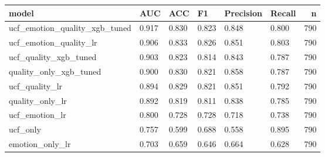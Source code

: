 \begin{tabular}{llllllr}
\toprule
model & AUC & ACC & F1 & Precision & Recall & n \\
\midrule
ucf\_emotion\_quality\_xgb\_tuned & 0.917 & 0.830 & 0.823 & 0.848 & 0.800 & 790 \\
ucf\_emotion\_quality\_lr & 0.906 & 0.833 & 0.826 & 0.851 & 0.803 & 790 \\
ucf\_quality\_xgb\_tuned & 0.903 & 0.823 & 0.814 & 0.843 & 0.787 & 790 \\
quality\_only\_xgb\_tuned & 0.900 & 0.830 & 0.821 & 0.858 & 0.787 & 790 \\
ucf\_quality\_lr & 0.894 & 0.829 & 0.821 & 0.851 & 0.792 & 790 \\
quality\_only\_lr & 0.892 & 0.819 & 0.811 & 0.838 & 0.785 & 790 \\
ucf\_emotion\_lr & 0.800 & 0.728 & 0.728 & 0.718 & 0.738 & 790 \\
ucf\_only & 0.757 & 0.599 & 0.688 & 0.558 & 0.895 & 790 \\
emotion\_only\_lr & 0.703 & 0.659 & 0.646 & 0.664 & 0.628 & 790 \\
\bottomrule
\end{tabular}

